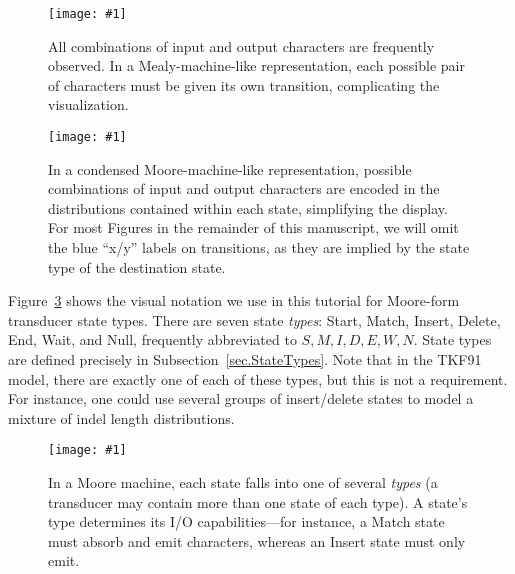 \documentclass{article}
\newcommand{\secref}[1]{Subsection~\ref{sec.#1}}
\newcommand{\figref}[1]{Figure~\ref{Figures.#1}}
\newcommand{\figlabel}[1]{\label{Figures.#1}}
\newcommand{\easyfig}[4]{
\begin{figure}
\texttt{[image: \#1]}
\caption{ \figlabel{#3} #4}
\end{figure}}
\newcommand{\widepngfig}[2]{\easyfig{#1.png}{width=\textwidth}{#1}{#2}}
\newcommand{\widepdffig}[2]{\easyfig{#1-fig.pdf}{width=\textwidth}{#1}{#2}}
\begin{document}
\widepngfig{fanned-emission}
{All combinations of input and output characters are frequently observed.  
In a Mealy-machine-like representation, each possible pair of characters must be given its own transition, complicating the visualization.}

\widepngfig{condensed-emission}
{In a condensed Moore-machine-like representation, possible combinations of input and output characters are encoded in the distributions contained within each state,
simplifying the display.  
For most Figures in the remainder of this manuscript, we will omit the blue ``x/y'' labels on transitions,
as they are implied by the state type of the destination state.}

\figref{legend} shows the visual notation we use in this tutorial for Moore-form transducer state types.
There are seven state {\em types}: Start, Match, Insert, Delete, End, Wait, and Null, frequently abbreviated to $S,M,I,D,E,W,N$.
State types are defined precisely in \secref{StateTypes}.
Note that in the TKF91 model, there are exactly one of each of these types, but this is not a requirement.  For instance, one could use several groups of insert/delete states to model a mixture of indel length distributions.  

\widepdffig{legend}{In a Moore machine, each state falls into one of several {\em types} (a transducer may contain more than one state of each type).  
A state's type determines its I/O capabilities---for instance, a Match state must absorb and emit characters, whereas an Insert state must only emit.}
\end{document}
